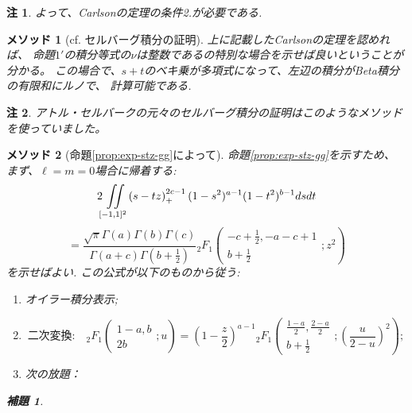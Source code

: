 \documentclass[12pt]{article} %
\newtheorem*{lemma*}{補題}
\newtheorem*{remark*}{\textbf{注}}
\newtheorem{method}{\textbf{メソッド}}
\theoremstyle{remark}
\begin{document}
{\begin{remark*}
	よって、Carlsonの定理の条件2.が必要である.
\end{remark*}
\begin{method}[cf. セルバーグ積分の証明]
	上に記載したCarlsonの定理を認めれば、
命題$1'$の積分等式の$\nu$は整数であるの特別な場合を示せば良いということが分かる。
この場合で、$s+t$のベキ乗が多項式になって、左辺の積分がBeta積分の有限和にルノで、
計算可能である.
\end{method}
\begin{remark*}
アトル・セルバークの元々のセルバーグ積分の証明はこのようなメソッドを使っていました。
\end{remark*}
\begin{method}[命題\ref{prop:exp-stz-gg}によって]
	命題\ref{prop:exp-stz-gg}を示すため、
まず、$\ell=m=0$場合に帰着する:
			\begin{equation*}
				 2\iint\displaylimits_{[-1,1]^2} \left( s-tz \right)_+^{2c-1}  (1 - s^2)^{a - 1} (1 -
				t^2)^{b - 1} d s d t
			\end{equation*}
			\begin{equation} =
				\frac{\sqrt{\pi} \Gamma (a) \Gamma (b) \Gamma
			(c)}{\Gamma (a + c) \Gamma \left( b + \frac{1}{2} \right)} {}_2 F_1 \left(
			\begin{array}{c}
				  - c + \frac{1}{2}, - a - c + 1\\
				    b + \frac{1}{2}
			    \end{array} ; z^2 \right)
				\label{eqn:prop21}
			\end{equation}
			を示せばよい.
	この公式が以下のものから従う:
	\begin{enumerate}
		\item オイラー積分表示;
		\item 
			\begin{equation*}
			\mbox{二次変換:}\quad {}_2 F_1 \left( \begin{array}{c}
				  1 - a, b\\
				    2 b
			    \end{array} ; u \right) = \left( 1 - \frac{z}{2} \right)^{a - 1} {}_2 F_1 \left(
			    \begin{array}{c}
				      \frac{1 - a}{2}, \frac{2 - a}{2}\\
					b + \frac{1}{2}
				\end{array} ; \left( \frac{u}{2 - u} \right)^2 \right);
			\end{equation*}
		\item 次の放題：
	\end{enumerate}
			\begin{lemma*}
				

\end{lemma*}
\end{method}}
\end{document}
